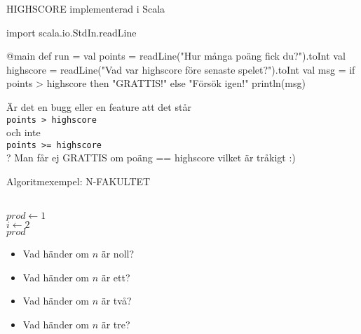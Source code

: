 \ifkompendium\else
\begin{SlideExtra}{HIGHSCORE implementerad i Scala}
\begin{Code}
import scala.io.StdIn.readLine

@main 
def run = 
  val points = readLine("Hur många poäng fick du?").toInt
  val highscore = readLine("Vad var highscore före senaste spelet?").toInt
  val msg = if points > highscore then "GRATTIS!" else "Försök igen!"
  println(msg)
\end{Code}
\SlideFontSmall %
\pause
Är det en bugg eller en feature att det står\\ \texttt{points > highscore} \\ och inte \\ \texttt{points >= highscore} \\ ?
\pause Man får ej GRATTIS om poäng == highscore vilket är tråkigt :)
\end{SlideExtra}



\fi

\begin{Slide}{Algoritmexempel: N-FAKULTET}
\begin{algorithm}[H]

 ~\\
 $prod \leftarrow 1$ \\
 $i \leftarrow 2$  \\
 $prod$
\end{algorithm}
\pause\vspace{1em}
\begin{itemize}\SlideFontSmall
\item Vad händer om $n$ är noll?
\item Vad händer om $n$ är ett?
\item Vad händer om $n$ är två?
\item Vad händer om $n$ är tre?
\end{itemize}
\end{Slide}

